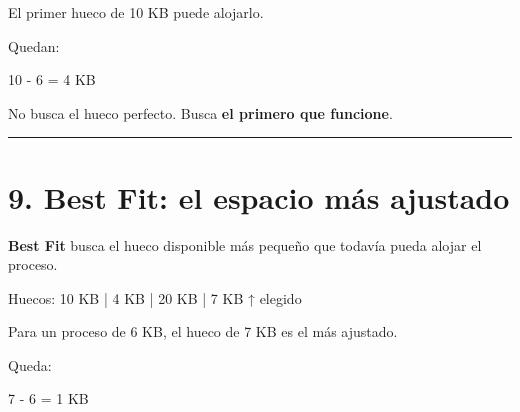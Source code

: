 \documentclass[
  spanish,
  letterpaper,
]{scrbook}
\newenvironment{Shaded}{\begin{snugshade}}{\end{snugshade}}
\newcommand{\NormalTok}[1]{\textcolor[rgb]{0.00,0.23,0.31}{#1}}
\begin{document}
El primer hueco de 10 KB puede alojarlo.

Quedan:

\begin{Shaded}
\begin{Highlighting}[]
\NormalTok{10 {-} 6 = 4 KB}
\end{Highlighting}
\end{Shaded}

\begin{tcolorbox}[enhanced jigsaw, arc=.35mm, bottomrule=.15mm, bottomtitle=1mm, breakable, colback=white, colbacktitle=quarto-callout-note-color!10!white, colframe=quarto-callout-note-color-frame, coltitle=black, left=2mm, leftrule=.75mm, opacityback=0, opacitybacktitle=0.6, rightrule=.15mm, title=\textcolor{quarto-callout-note-color}{\faInfo}\hspace{0.5em}{Idea de First Fit}, titlerule=0mm, toprule=.15mm, toptitle=1mm]

No busca el hueco perfecto. Busca \textbf{el primero que funcione}.

\end{tcolorbox}

\begin{center}\rule{0.5\linewidth}{0.5pt}\end{center}


\chapter{9. Best Fit: el espacio más
ajustado}\label{best-fit-el-espacio-muxe1s-ajustado}

\textbf{Best Fit} busca el hueco disponible más pequeño que todavía
pueda alojar el proceso.

\begin{Shaded}
\begin{Highlighting}[]
\NormalTok{Huecos: 10 KB | 4 KB | 20 KB | 7 KB}
\NormalTok{                                  ↑}
\NormalTok{                               elegido}
\end{Highlighting}
\end{Shaded}

Para un proceso de 6 KB, el hueco de 7 KB es el más ajustado.

Queda:

\begin{Shaded}
\begin{Highlighting}[]
\NormalTok{7 {-} 6 = 1 KB}
\end{Highlighting}
\end{Shaded}
\end{document}
